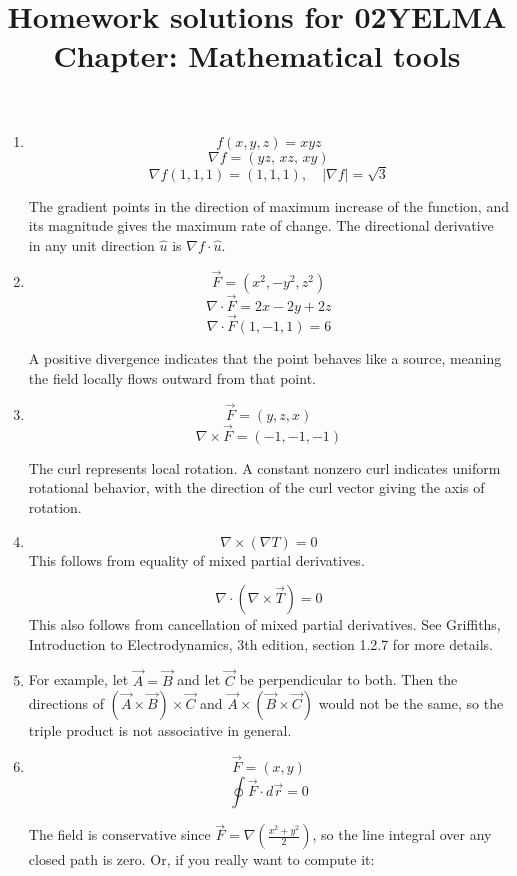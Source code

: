 \documentclass[12pt]{article}
\title{Homework solutions for 02YELMA \\ Chapter: Mathematical tools}
\begin{document}
\date{}
\maketitle
\vspace{-0.8in}

\begin{enumerate}

\item 
\[
f(x,y,z)=xyz
\]
\[
\nabla f = (yz,\, xz,\, xy)
\]
\[
\nabla f(1,1,1) = (1,1,1), \quad |\nabla f|=\sqrt{3}
\]

The gradient points in the direction of maximum increase of the function, and its magnitude gives the maximum rate of change. The directional derivative in any unit direction $\hat{u}$ is $\nabla f \cdot \hat{u}$.

\item 
\[
\vec{F}=(x^2,-y^2,z^2)
\]
\[
\nabla \cdot \vec{F} = 2x - 2y + 2z
\]
\[
\nabla \cdot \vec{F}(1,-1,1)=6
\]

A positive divergence indicates that the point behaves like a source, meaning the field locally flows outward from that point.

\item 
\[
\vec{F}=(y,z,x)
\]
\[
\nabla \times \vec{F} = (-1,-1,-1)
\]

The curl represents local rotation. A constant nonzero curl indicates uniform rotational behavior, with the direction of the curl vector giving the axis of rotation.

\item 
\[
\nabla \times (\nabla T)=0
\]
This follows from equality of mixed partial derivatives.

\[
\nabla \cdot (\nabla \times \vec{T})=0
\]
This also follows from cancellation of mixed partial derivatives. See Griffiths, Introduction to Electrodynamics, 3th edition, section 1.2.7 for more details.

\item For example, let $\vec{A}=\vec{B}$ and let $\vec{C}$ be perpendicular to both. Then the directions of $(\vec{A}\times \vec{B})\times \vec{C}$ and $\vec{A}\times (\vec{B}\times \vec{C})$ would not be the same, so the triple product is not associative in general.

\item 
\[
\vec{F}=(x,y)
\]
\[
\oint \vec{F}\cdot d\vec{r} = 0
\]

The field is conservative since $\vec{F}=\nabla\left(\frac{x^2+y^2}{2}\right)$, so the line integral over any closed path is zero. Or, if you really want to compute it:


\end{enumerate}
\end{document}
